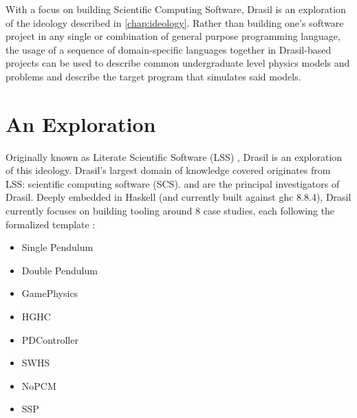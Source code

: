 With a focus on building Scientific Computing Software,
Drasil\thinspace\cite{Drasil2021} is an exploration of the ideology described in
\autoref{chap:ideology}. Rather than building one's software project in any
single or combination of general purpose programming language, the usage of a
sequence of domain-specific languages together in Drasil-based projects can be
used to describe common undergraduate level physics models and problems and
describe the target program that simulates said models.



\section{An Exploration}

Originally known as Literate Scientific Software (LSS) , Drasil is an
exploration of this ideology. Drasil's largest domain of knowledge covered
originates from LSS: scientific computing software (SCS).  and  are the principal investigators of
Drasil. Deeply embedded in Haskell  (and currently built against
\acs{ghc}  8.8.4), Drasil currently focuses on building tooling around
8 case studies, each following the formalized  template
\cite{SmithAndLai2005}:

\begin{itemize}

      \item Single Pendulum

      \item Double Pendulum

      \item GamePhysics

      \item HGHC

      \item PDController

      \item SWHS

      \item NoPCM

      \item SSP

\end{itemize}

